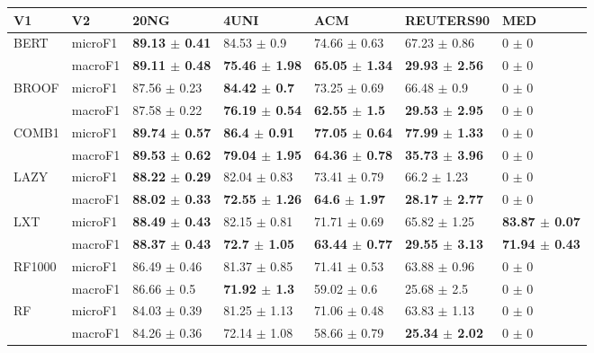 \documentclass[]{article}
\begin{document}
\begin{table}[ht]
\centering
\begin{tabular}{lllllll}
  \hline
V1 & V2 & 20NG & 4UNI & ACM & REUTERS90 & MED \\ 
  \hline
\multirow{2}{*}{BERT} & microF1 & \bf{89.13 $\pm$  0.41} & 84.53 $\pm$  0.9 & 74.66 $\pm$  0.63 & 67.23 $\pm$  0.86 & 0 $\pm$  0 \\ 
   & macroF1 & \bf{89.11 $\pm$  0.48} & \bf{75.46 $\pm$  1.98} & \bf{65.05 $\pm$  1.34} & \bf{29.93 $\pm$  2.56} & 0 $\pm$  0 \\ 
  \multirow{2}{*}{BROOF} & microF1 & 87.56 $\pm$  0.23 & \bf{84.42 $\pm$  0.7} & 73.25 $\pm$  0.69 & 66.48 $\pm$  0.9 & 0 $\pm$  0 \\ 
   & macroF1 & 87.58 $\pm$  0.22 & \bf{76.19 $\pm$  0.54} & \bf{62.55 $\pm$  1.5} & \bf{29.53 $\pm$  2.95} & 0 $\pm$  0 \\ 
  \multirow{2}{*}{COMB1} & microF1 & \bf{89.74 $\pm$  0.57} & \bf{86.4 $\pm$  0.91} & \bf{77.05 $\pm$  0.64} & \bf{77.99 $\pm$  1.33} & 0 $\pm$  0 \\ 
   & macroF1 & \bf{89.53 $\pm$  0.62} & \bf{79.04 $\pm$  1.95} & \bf{64.36 $\pm$  0.78} & \bf{35.73 $\pm$  3.96} & 0 $\pm$  0 \\ 
  \multirow{2}{*}{LAZY} & microF1 & \bf{88.22 $\pm$  0.29} & 82.04 $\pm$  0.83 & 73.41 $\pm$  0.79 & 66.2 $\pm$  1.23 & 0 $\pm$  0 \\ 
   & macroF1 & \bf{88.02 $\pm$  0.33} & \bf{72.55 $\pm$  1.26} & \bf{64.6 $\pm$  1.97} & \bf{28.17 $\pm$  2.77} & 0 $\pm$  0 \\ 
  \multirow{2}{*}{LXT} & microF1 & \bf{88.49 $\pm$  0.43} & 82.15 $\pm$  0.81 & 71.71 $\pm$  0.69 & 65.82 $\pm$  1.25 & \bf{83.87 $\pm$  0.07} \\ 
   & macroF1 & \bf{88.37 $\pm$  0.43} & \bf{72.7 $\pm$  1.05} & \bf{63.44 $\pm$  0.77} & \bf{29.55 $\pm$  3.13} & \bf{71.94 $\pm$  0.43} \\ 
  \multirow{2}{*}{RF1000} & microF1 & 86.49 $\pm$  0.46 & 81.37 $\pm$  0.85 & 71.41 $\pm$  0.53 & 63.88 $\pm$  0.96 & 0 $\pm$  0 \\ 
   & macroF1 & 86.66 $\pm$  0.5 & \bf{71.92 $\pm$  1.3} & 59.02 $\pm$  0.6 & 25.68 $\pm$  2.5 & 0 $\pm$  0 \\ 
  \multirow{2}{*}{RF} & microF1 & 84.03 $\pm$  0.39 & 81.25 $\pm$  1.13 & 71.06 $\pm$  0.48 & 63.83 $\pm$  1.13 & 0 $\pm$  0 \\ 
   & macroF1 & 84.26 $\pm$  0.36 & 72.14 $\pm$  1.08 & 58.66 $\pm$  0.79 & \bf{25.34 $\pm$  2.02} & 0 $\pm$  0 \\ 

\end{tabular}
\end{table}
\end{document}
